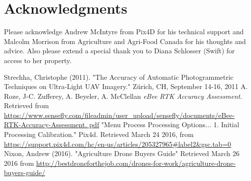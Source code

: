 \documentclass{article}
\begin{document}
\section{Acknowledgments}

Please acknowledge Andrew McIntyre from Pix4D for his technical support and Malcolm Morrison from Agriculture and Agri-Food Canada for his thoughts and advice.  Also please extend a special thank you to Diana Schlosser (Swift) for access to her property.

\begin{thebibliography}{9}
Strechha,  Christophe (2011). "The Accuracy of Automatic Photogrammetric Techniques on Ultra-Light
UAV Imagery."  Zürich, CH, September
14-16, 2011
A. Roze, J-C. Zufferey, A. Beyeler, A. McClellan \textit{eBee RTK Accuracy Assessment}.
Retrieved from
\url{https://www.sensefly.com/fileadmin/user_upload/sensefly/documents/eBee-RTK-Accuracy-Assessment.
pdf}
"Menu Process Processing Options... 1. Initial Processing Calibration." Pix4d. Retrieved March 24
2016, from \url{https://support.pix4d.com/hc/en-us/articles/205327965#label2&gsc.tab=0}
Nixon, Andrew (2016). "Agriculture Drone Buyers Guide" Retrieved March 26 2016 from \url{http://bestdroneforthejob.com/drones-for-work/agriculture-drone-buyers-guide/}
\end{thebibliography}
\thispagestyle{lastpage}
\end{document}
